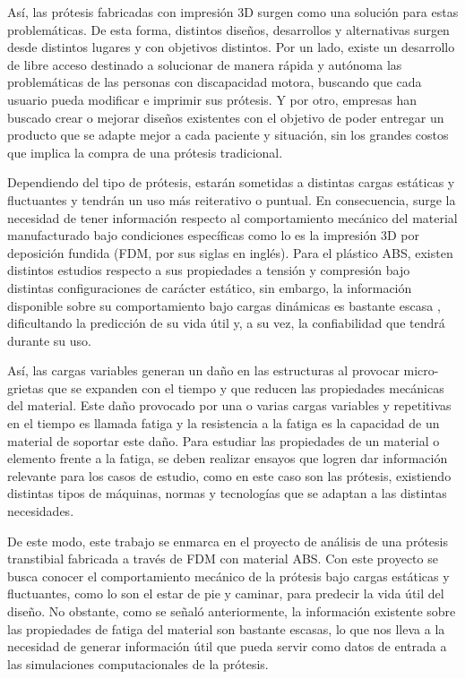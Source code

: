 Así, las prótesis fabricadas con impresión 3D surgen como una solución para estas problemáticas. De esta forma, distintos diseños, desarrollos y alternativas surgen desde distintos lugares y con objetivos distintos. Por un lado, existe un desarrollo de libre acceso destinado a solucionar de manera rápida y autónoma las problemáticas de las personas con discapacidad motora, buscando que cada usuario pueda modificar e imprimir sus prótesis. Y por otro, empresas han buscado crear o mejorar diseños existentes con el objetivo de poder entregar un producto que se adapte mejor a cada paciente y situación, sin los grandes costos que implica la compra de una prótesis tradicional.

Dependiendo del tipo de prótesis, estarán sometidas a distintas cargas estáticas y fluctuantes y tendrán un uso más reiterativo o puntual. En consecuencia, surge la necesidad de tener información respecto al comportamiento mecánico del material manufacturado bajo condiciones específicas como lo es la impresión 3D por deposición fundida (FDM, por sus siglas en inglés). Para el plástico ABS, existen distintos estudios respecto a sus propiedades a tensión y compresión bajo distintas configuraciones de carácter estático, sin embargo, la información disponible sobre su comportamiento bajo cargas dinámicas es bastante escasa \cite{lee2013fatigue}\cite{zhang2018tensile}, dificultando la predicción de su vida útil y, a su vez, la confiabilidad que tendrá durante su uso.

Así, las cargas variables generan un daño en las estructuras al provocar micro-grietas que se expanden con el tiempo y que reducen las propiedades mecánicas del material. Este daño provocado por una o varias cargas variables y repetitivas en el tiempo es llamada fatiga y la resistencia a la fatiga es la capacidad de un material de soportar este daño. Para estudiar las propiedades de un material o elemento frente a la fatiga, se deben realizar ensayos que logren dar información relevante para los casos de estudio, como en este caso son las prótesis, existiendo distintas tipos de máquinas, normas y tecnologías que se adaptan a las distintas necesidades.

De este modo, este trabajo se enmarca en el proyecto de análisis de una prótesis transtibial fabricada a través de FDM con material ABS. Con este proyecto se busca conocer el comportamiento mecánico de la prótesis bajo cargas estáticas y fluctuantes, como lo son el estar de pie y caminar, para predecir la vida útil del diseño. No obstante, como se señaló anteriormente, la información existente sobre las propiedades de fatiga del material son bastante escasas, lo que nos lleva a la necesidad de generar información útil que pueda servir como datos de entrada a las simulaciones computacionales de la prótesis.

